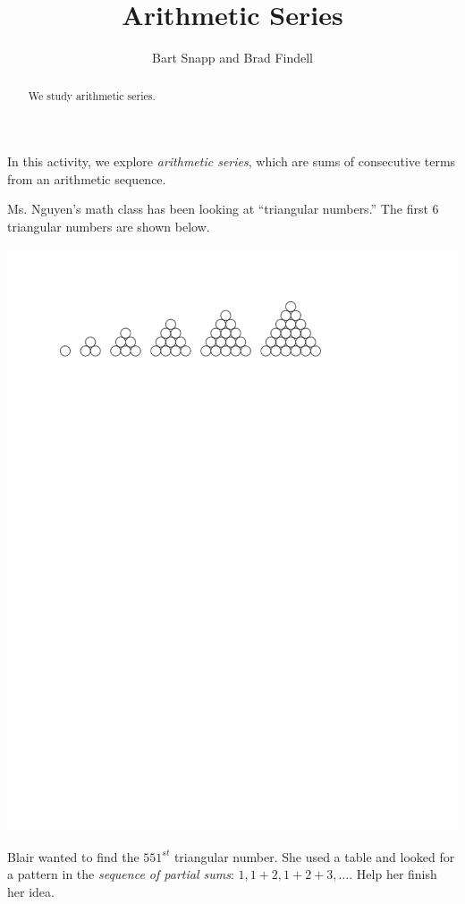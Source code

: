 \documentclass{ximera}
\title{Arithmetic Series}
\author{Bart Snapp and Brad Findell}
\begin{document}
\begin{abstract}
We study arithmetic series.
\end{abstract}
\maketitle

\label{A:arithmeticSeries}

In this activity, we explore \emph{arithmetic series}, which are sums of consecutive terms from an arithmetic sequence.

Ms. Nguyen's math class has been looking at ``triangular numbers.''  The first 6 triangular numbers are shown below. 
\begin{image}
\includegraphics{graphics/triangularNumbers}
\end{image}

\begin{problem}
Blair wanted to find the $551^{st}$ triangular number.  She used a table and looked for a pattern in the \emph{sequence of partial sums}:  $1, 1+2, 1+2+3, \dots$.  Help her finish her idea.  
\end{problem}
\end{document}
